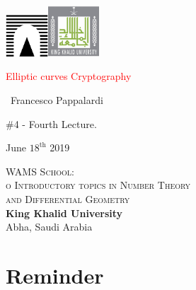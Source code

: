 \documentclass{beamer}%
\title[Elliptic curves over $\F_{q}$]{\insertlecture}
\theoremstyle{definition}
\begin{document}
\begin{frame}
\includegraphics[width=1.6cm]{images/roma3.pdf}\hfill\includegraphics[width=1.9cm]{images/kku.jpeg}
\vfill

\begin{center}\begin{sc}
\begin{Large}

\textcolor{red}{Elliptic curves Cryptography}
\end{Large}\bigskip

\ {Francesco Pappalardi}\bigskip\bigskip

\begin{large}\begin{bf}\#4 - Fourth Lecture.
\end{bf}\end{large}\medskip

June $18^{\text{th}}$ 2019\medskip
\vfill
\end{sc}\end{center}

\begin{minipage}[b]{9.3cm}
\textsc{WAMS School:\\o
Introductory topics in Number Theory\\ and Differential Geometry}\\
\textbf{King Khalid University}\\
Abha, Saudi Arabia
\end{minipage}\hfill
\end{frame}




\section{Reminder}
\end{document}
